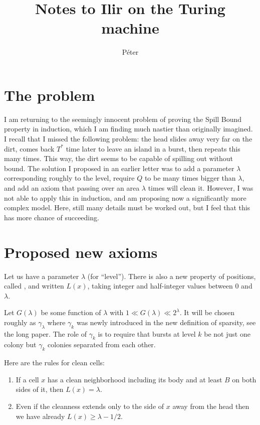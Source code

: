 \documentclass[12pt]{memoir}
\renewcommand{\ge}{\geq}
\newcommand{\Tu}{T}
\begin{document}
\title{Notes to Ilir on the Turing machine}

\author{P\'eter}

\maketitle

\section{The problem}

I am returning to the seemingly innocent problem of proving the Spill Bound property
in induction, which I am finding much nastier than originally imagined.
I recall that I missed the following problem: 
the head slides away very far on the dirt, 
comes back \( \Tu^{*} \) time later to leave an island in a burst, 
then repeats this many times.
This way, the dirt seems to be capable of spilling out without bound.
The solution I proposed in an earlier letter was to add a parameter \( \lambda \)
corresponding roughly to the level, require \( Q \) to be many times bigger than \( \lambda \),
and add an axiom that passing over an area \( \lambda \) times will clean it.
However, I was not able to apply this in induction, and am proposing now a significantly
more complex model.
Here, still many details must be worked out, but I feel that this has more chance of succeeding.

\section{Proposed new axioms}

Let us have a parameter \( \lambda \) (for ``level'').
There is also a new property of positions, called , and written \( L(x) \),
taking integer and half-integer values between 0 and \( \lambda \).

Let \( G(\lambda) \) be some function of \( \lambda \) with \( 1\ll G(\lambda)\ll 2^{\lambda} \).
It will be chosen roughly as \( \gamma_{\lambda} \) where \( \gamma_{k} \) was newly introduced
in the new definition of sparsity, see the long paper.
The role of \( \gamma_{k} \) is to require that bursts at level \( k \) be
not just one colony but \( \gamma_{k} \) colonies separated from each other.

Here are the rules for clean cells:
\begin{enumerate}[label=\upshape{(L\arabic*)}, ref=L\arabic*]
\item\label{i:level.whole}
 If a cell \( x \) has a clean neighborhood including its body and at least \( B \) on both 
sides of it, then \( L(x) = \lambda \).
\item\label{i:level.half} Even if the cleanness extends only to the side of \( x \) away from the head 
then we have already \( L(x)\ge\lambda-1/2 \).
\end{enumerate}
\end{document}
